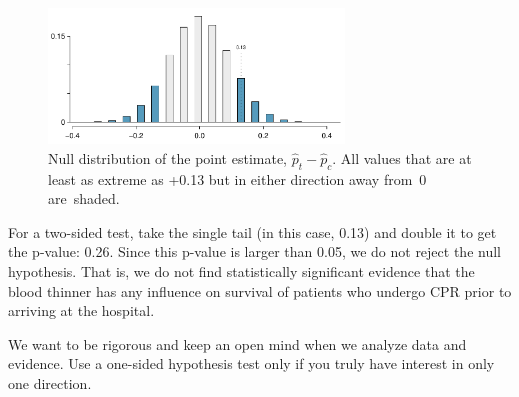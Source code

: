 
\begin{figure}[ht]
\centering
\includegraphics[width=0.7\textwidth]{05/figures/CPR_study/CPR_study_p_value}
\caption{Null distribution of the point estimate, $\hat{p}_t - \hat{p}_c$. All values that are at least as extreme as +0.13 but in either direction away from~0 are~shaded.}
\label{CPR_study_p_value}
\end{figure}

For a two-sided test, take the single tail (in this case, 0.13) and double it to get the p-value: 0.26. Since this p-value is larger than 0.05, we do not reject the null hypothesis. That is, we do not find statistically significant evidence that the blood thinner has any influence on survival of patients who undergo CPR prior to arriving at the hospital. %


\begin{termBox}{
We want to be rigorous and keep an open mind when we analyze data and evidence. Use a one-sided hypothesis test only if you truly have interest in only one direction.}
\end{termBox}

